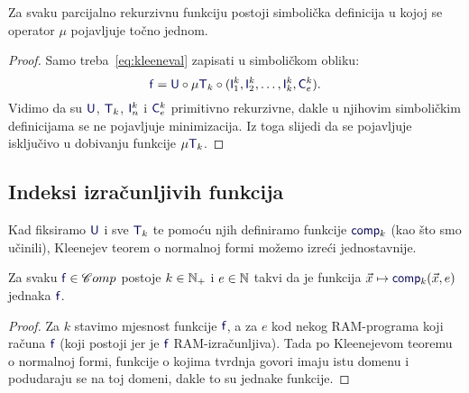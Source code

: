 \begin{korolar}[{name=[jedna minimizacija je dovoljna]}]
Za svaku parcijalno rekurzivnu funkciju postoji simbolička definicija u kojoj se operator $\mu$ pojavljuje točno jednom.
\end{korolar}
\begin{proof}
Samo treba~\eqref{eq:kleeneval} zapisati u simboličkom obliku:
\begin{equation}
    \f f=\f U\circ\mu\f T_k\circ(\f I_1^k,\f I_2^k,\dotsc,\f I_k^k,\f C_e^k)\text.
\end{equation}
Vidimo da su $\f U$, $\f T_k$, $\f I_n^k$ i $\f C_e^k$ primitivno rekurzivne, dakle u njihovim simboličkim definicijama se ne pojavljuje minimizacija. Iz toga slijedi da se pojavljuje isključivo u dobivanju funkcije $\mu\f T_k$.
\end{proof}


\subsection{Indeksi izračunljivih funkcija}

Kad fiksiramo $\f U$ i sve $\f T_k$ te pomoću njih definiramo funkcije $\f{comp}_k$ (kao što smo učinili), Kleenejev teorem o normalnoj formi možemo izreći jednostavnije.

\begin{korolar}[{name=[svaka izračunljiva funkcija je specijalizacija univerzalne]}]\label{kor:pimi}
Za svaku $\f f\in\mathscr Comp$ postoje $k\in{\mathbb N}_+$ i $e\in{\mathbb N}$ takvi da je funkcija $\vec x\mapsto\f{comp}_k(\vec x,e)$ jednaka $\f f$.
\end{korolar}

\begin{proof}
Za $k$ stavimo mjesnost funkcije $\f f$, a za $e$ kod nekog RAM-programa koji računa $\f f$ (koji postoji jer je $\f f$ RAM-izračunljiva). Tada po Kleenejevom teoremu o normalnoj formi, funkcije o kojima tvrdnja govori imaju istu domenu i podudaraju se na toj domeni, dakle to su jednake funkcije.
\end{proof}

